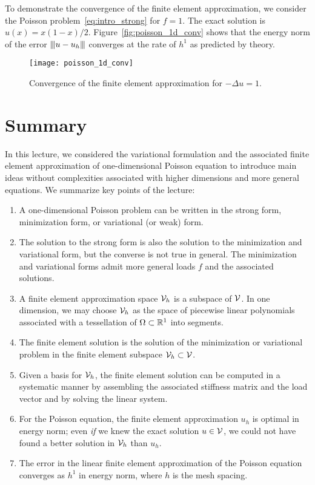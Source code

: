 To demonstrate the convergence of the finite element approximation, we consider the Poisson problem~\eqref{eq:intro_strong} for $f = 1$. The exact solution is $u(x) = x(1-x)/2$. Figure~\eqref{fig:poisson_1d_conv} shows that the energy norm of the error $|\kern-1pt|\kern-1pt| u - u_h |\kern-1pt|\kern-1pt|$ converges at the rate of $h^1$ as predicted by theory.
\begin{figure}
  \centering
  \texttt{[image: poisson\_1d\_conv]}
  \caption{Convergence of the finite element approximation for $-\Delta u = 1$.}
  \label{fig:poisson_1d_conv}
\end{figure}

\section{Summary}
In this lecture, we considered the variational formulation and the associated finite element approximation of one-dimensional Poisson equation to introduce main ideas without complexities associated with higher dimensions and more general equations.  We summarize key points of the lecture:
\begin{enumerate}
\item A one-dimensional Poisson problem can be written in the strong form, minimization form, or variational (or weak) form. 
\item The solution to the strong form is also the solution to the minimization and variational form, but the converse is not true in general.  The minimization and variational forms admit more general loads $f$ and the associated solutions.
\item A finite element approximation space $\mathcal{V}_h$ is a subspace of $\mathcal{V}$.  In one dimension, we may choose $\mathcal{V}_h$ as the space of piecewise linear polynomials associated with a tessellation of $\Omega \subset \mathbb{R}^1$ into segments.
\item The finite element solution is the solution of the minimization or variational problem in the finite element subspace $\mathcal{V}_h \subset \mathcal{V}$.
\item Given a basis for $\mathcal{V}_h$, the finite element solution can be computed in a systematic manner by assembling the associated stiffness matrix and the load vector and by solving the linear system.
\item For the Poisson equation, the finite element approximation $u_h$ is optimal in energy norm; even \emph{if} we knew the exact solution $u \in \mathcal{V}$, we could not have found a better solution in $\mathcal{V}_h$ than $u_h$.
\item The error in the linear finite element approximation of the Poisson equation converges as $h^1$ in energy norm, where $h$ is the mesh spacing.
\end{enumerate}
